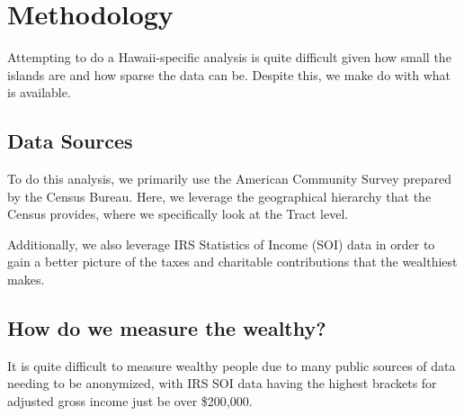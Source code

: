 \section{Methodology}
Attempting to do a Hawaii-specific analysis is quite difficult given how small the islands are and how sparse the data can be. 
Despite this, we make do with what is available.

\subsection*{Data Sources}
To do this analysis, we primarily use the American Community Survey prepared by the Census Bureau. 
Here, we leverage the geographical hierarchy that the Census provides, where we specifically look at the Tract level. 

Additionally, we also leverage IRS Statistics of Income (SOI) data in order to gain a better picture of the taxes and charitable contributions that the wealthiest makes.

\subsection*{How do we measure the wealthy?}

It is quite difficult to measure wealthy people due to many public sources of data needing to be anonymized, 
with IRS SOI data having the highest brackets for adjusted gross income just be over \$200,000.